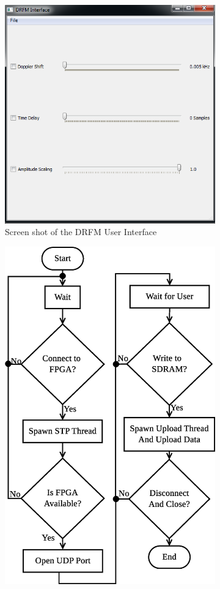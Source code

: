 		\begin{figure}[h!]
			\centering
			\begin{subfigure}{0.5\linewidth}
				\centering
				\includegraphics[width=.9\linewidth]{img/UI}
				\caption{Screen shot of the DRFM User Interface}
				\label{fig:UI}
			\end{subfigure}%
			\begin{subfigure}{0.5\linewidth}
				\centering
				\includegraphics[width=.9\linewidth]{img/UI_Flowchart}

\end{subfigure}
\end{figure}
